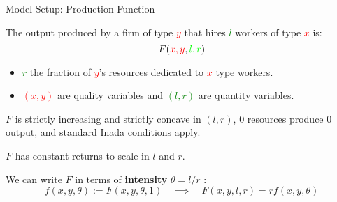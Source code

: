 \documentclass[notes,11pt, aspectratio=169]{beamer}
\newenvironment{wideitemize}{\itemize\addtolength{\itemsep}{10pt}}{\enditemize}
\begin{document}
\begin{frame}{Model Setup:  Production Function}
	\begin{wideitemize}
		\item The output produced by a firm of type \textcolor{red}{$y$} that hires \textcolor{green}{$l$} workers of type \textcolor{red}{$x$} is: \[F(\textcolor{red}{x,y},\textcolor{green}{l,r})\]
		\begin{itemize}
			\item \textcolor{green}{$r$} the fraction of \textcolor{red}{$y$}'s resources dedicated to \textcolor{red}{$x$} type workers.
			\item \textcolor{red}{$(x,y)$} are quality variables and \textcolor{green}{$(l,r)$} are quantity variables.
		\end{itemize}
		\pause
		\item $F$ is strictly increasing and strictly concave in $(l,r)$, $0$ resources produce $0$ output, and standard Inada conditions apply.
		\item  $F$ has constant returns to scale in $l$ and $r$.
		\pause
		\item  We can write $F$ in terms of \textbf{intensity} $\theta=l/r$ :\[f(x,y,\theta):=F(x,y,\theta,1)\quad \implies \quad F(x,y,l,r) = rf(x,y,\theta)\]
	\end{wideitemize}
\end{frame}
\end{document}
